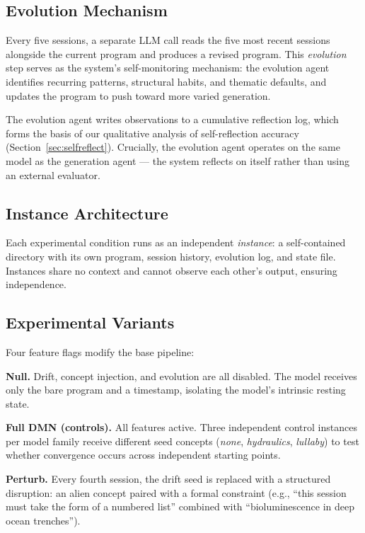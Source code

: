 \documentclass{article}
\begin{document}
\subsection{Evolution Mechanism}
\label{sec:evo}

Every five sessions, a separate LLM call reads the five most recent sessions
alongside the current program and produces a revised program. This
\emph{evolution} step serves as the system's self-monitoring mechanism: the
evolution agent identifies recurring patterns, structural habits, and thematic
defaults, and updates the program to push toward more varied generation.

The evolution agent writes observations to a cumulative reflection log, which
forms the basis of our qualitative analysis of self-reflection accuracy
(Section~\ref{sec:selfreflect}). Crucially, the evolution agent operates on
the same model as the generation agent --- the system reflects on itself rather
than using an external evaluator.

\subsection{Instance Architecture}

Each experimental condition runs as an independent \emph{instance}: a
self-contained directory with its own program, session history, evolution log,
and state file. Instances share no context and cannot observe each other's
output, ensuring independence.

\subsection{Experimental Variants}
\label{sec:variants}

Four feature flags modify the base pipeline:

\textbf{Null.} Drift, concept injection, and evolution are all disabled. The
model receives only the bare program and a timestamp, isolating the model's
intrinsic resting state.

\textbf{Full DMN (controls).} All features active. Three independent control
instances per model family receive different seed concepts (\emph{none},
\emph{hydraulics}, \emph{lullaby}) to test whether convergence occurs across
independent starting points.

\textbf{Perturb.} Every fourth session, the drift seed is replaced with a
structured disruption: an alien concept paired with a formal constraint (e.g.,
``this session must take the form of a numbered list'' combined with
``bioluminescence in deep ocean trenches'').
\end{document}
